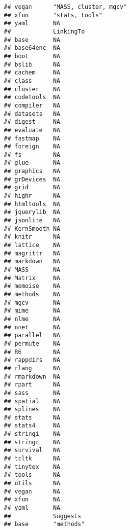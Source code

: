 \documentclass[
]{article}
\begin{document}
\begin{verbatim}
## vegan      "MASS, cluster, mgcv"                                                                                                                                                                                  
## xfun       "stats, tools"                                                                                                                                                                                         
## yaml       NA                                                                                                                                                                                                     
##            LinkingTo
## base       NA       
## base64enc  NA       
## boot       NA       
## bslib      NA       
## cachem     NA       
## class      NA       
## cluster    NA       
## codetools  NA       
## compiler   NA       
## datasets   NA       
## digest     NA       
## evaluate   NA       
## fastmap    NA       
## foreign    NA       
## fs         NA       
## glue       NA       
## graphics   NA       
## grDevices  NA       
## grid       NA       
## highr      NA       
## htmltools  NA       
## jquerylib  NA       
## jsonlite   NA       
## KernSmooth NA       
## knitr      NA       
## lattice    NA       
## magrittr   NA       
## markdown   NA       
## MASS       NA       
## Matrix     NA       
## memoise    NA       
## methods    NA       
## mgcv       NA       
## mime       NA       
## nlme       NA       
## nnet       NA       
## parallel   NA       
## permute    NA       
## R6         NA       
## rappdirs   NA       
## rlang      NA       
## rmarkdown  NA       
## rpart      NA       
## sass       NA       
## spatial    NA       
## splines    NA       
## stats      NA       
## stats4     NA       
## stringi    NA       
## stringr    NA       
## survival   NA       
## tcltk      NA       
## tinytex    NA       
## tools      NA       
## utils      NA       
## vegan      NA       
## xfun       NA       
## yaml       NA       
##            Suggests                                                                                                                                                                                                                                                                                                                                           
## base       "methods"                                                                                                                                                                                                                                                                                                                                          

\end{verbatim}
\end{document}
